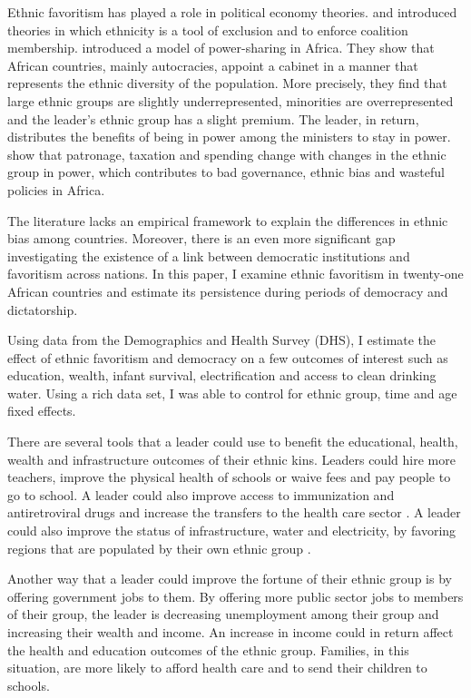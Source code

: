 \documentclass{wptemp}
\begin{document}
Ethnic favoritism has played a role in political economy theories. \citet{fearon1999ethnic} and \citet{caselli2006theory} introduced theories in which ethnicity is a tool of exclusion and to enforce coalition membership. \citet{francois2015power} introduced a model of power-sharing in Africa. They show that African countries, mainly autocracies, appoint a cabinet in a manner that represents the ethnic diversity of the population. More precisely, they find that large ethnic groups are slightly underrepresented, minorities are overrepresented and the leader's ethnic group has a slight premium. The leader, in return, distributes the benefits of being in power among the ministers to stay in power. \citet{padro2007control} show that patronage, taxation and spending change with changes in the ethnic group in power, which contributes to bad governance, ethnic bias and wasteful policies in Africa.


The literature lacks an empirical framework to explain the differences in ethnic bias among countries. Moreover, there is an even more significant gap investigating the existence of a link between democratic institutions and favoritism across nations. In this paper, I examine ethnic favoritism in twenty-one African countries and estimate its persistence during periods of democracy and dictatorship. 

Using data from the Demographics and Health Survey (DHS), I estimate the effect of ethnic favoritism and democracy on a few outcomes of interest such as education, wealth, infant survival, electrification and access to clean drinking water. Using a rich data set, I was able to control for ethnic group, time and age fixed effects. 

There are several tools that a leader could use to benefit the educational, health, wealth and infrastructure outcomes of their ethnic kins. Leaders could hire more teachers, improve the physical health of schools \citep{glewwe2006schools} or waive fees and pay people to go to school. A leader could also improve access to immunization and antiretroviral drugs and increase the transfers to the health care sector \citep{friedman2018corruption, jones2003many}. A leader could also improve the status of infrastructure, water and electricity, by favoring regions that are populated by their own ethnic group \citep{hodler2014regional}.

Another way that a leader could improve the fortune of their ethnic group is by offering government jobs to them. By offering more public sector jobs to members of their group, the leader is decreasing unemployment among their group and increasing their wealth and income. An increase in income could in return affect the health and education outcomes of the ethnic group. Families, in this situation, are more likely to afford health care and to send their children to schools. 
\end{document}
